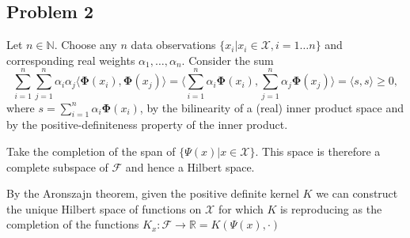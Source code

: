 \documentclass[12pt]{article}
\begin{document}


\subsection{Problem 2}
		Let $n \in \mathbb{N}$. Choose any $n$ data observations $\{x_i | x_i \in \mathcal{X}, i=1\ldots n\}$ and corresponding real weights $\alpha_1, \ldots, \alpha_n$. Consider the sum $$\sum_{i=1}^n \sum_{j=1}^n \alpha_i \alpha_j \langle \mathbf{\Phi}(x_i), \mathbf{\Phi}(x_j) \rangle = \langle \sum_{i=1}^n \alpha_i \mathbf{\Phi}(x_i), \sum_{j=1}^n \alpha_j \mathbf{\Phi}(x_j) \rangle = \langle s, s \rangle \geq 0,$$ where $s=\sum_{i=1}^n \alpha_i \mathbf{\Phi}(x_i)$, by the bilinearity of a (real) inner product space and by the positive-definiteness property of the inner product.






	Take the completion of the span of $\{\Psi(x) | x \in \mathcal{X}\}$. This space is therefore a complete subspace of $\mathcal{F}$ and hence a Hilbert space.

	By the Aronszajn theorem, given the positive definite kernel $K$ we can construct the unique Hilbert space of functions on $\mathcal{X}$ for which $K$ is reproducing as the completion of the functions $K_x: \mathcal{F} \rightarrow \mathbb{R} = K(\Psi(x), \cdot)$
	
\end{document}
